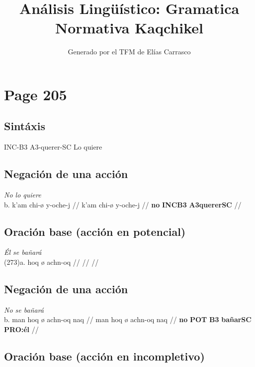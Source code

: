 \documentclass{article}%
\title{Análisis Lingüístico: Gramatica Normativa Kaqchikel}%
\author{Generado por el TFM de Elías Carrasco}%
\begin{document}
%
\normalsize%
\maketitle%
\section{Page 205}%
\label{sec:Page205}%
\subsection{Sintáxis}%
\label{subsec:Sintxis}%

%
INC{-}B3 %
A3{-}querer{-}SC %
Lo quiere %
\subsection{Negación de una acción}%
\label{subsec:Negacindeunaaccin}%

%
\par\medskip%
\ex
\textit{No lo quiere} \\
\begingl
\gla b. k'am chi-ø y-oche-j //
\glb k'am chi-ø y-oche-j //
\glc \textbf{no} \textbf{INC}\textbf{B3} \textbf{A3}\textbf{querer}\textbf{SC} //
\endgl
\xe
%
\medskip%
\subsection{Oración base (acción en potencial)}%
\label{subsec:Oracinbase(accinenpotencial)}%

%
\par\medskip%
\ex
\textit{Él se bañará} \\
\begingl
\gla (273)a. hoq ø achn-oq //
\glb  //
\glc  //
\endgl
\xe
%
\medskip%
\subsection{Negación de una acción}%
\label{subsec:Negacindeunaaccin}%

%
\par\medskip%
\ex
\textit{No se bañará} \\
\begingl
\gla b. man hoq ø achn-oq naq //
\glb man hoq ø achn-oq naq //
\glc \textbf{no} \textbf{POT} \textbf{B3} \textbf{bañar}\textbf{SC} \textbf{PRO:él} //
\endgl
\xe
%
\medskip%
\subsection{Oración base (acción en incompletivo)}%
\label{subsec:Oracinbase(accinenincompletivo)}%
\end{document}
